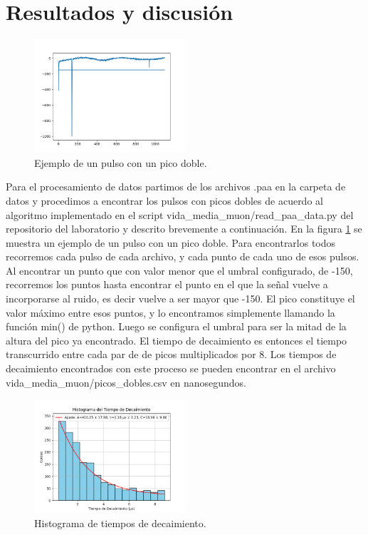 \documentclass[twocolumn,a4paper,11pt]{scrartcl}
\begin{document}
\section{Resultados y discusión}


\begin{figure}[h]
  \centering
  \includegraphics[width=0.5\textwidth]{pulse_plot.png}
  \caption{Ejemplo de un pulso con un pico doble.}
  \label{fig:pulse_plot}
\end{figure}

Para el procesamiento de datos partimos de los archivos .paa en la carpeta de datos \cite{CarpetaDatos} y procedimos a encontrar los pulsos con picos dobles de acuerdo al algoritmo implementado en el script vida\_media\_muon/read\_paa\_data.py del repositorio del laboratorio \cite{BrianDL_laboratorio} y descrito brevemente a continuación. 
En la figura \ref{fig:pulse_plot} se muestra un ejemplo de un pulso con un pico doble. Para encontrarlos todos recorremos cada pulso de cada archivo, y cada punto de cada uno de esos pulsos.
Al encontrar un punto que con valor menor que el umbral configurado, de -150, recorremos los puntos hasta encontrar el punto en el que la señal vuelve a incorporarse al ruido, es decir vuelve a ser mayor que -150. El pico constituye el valor máximo entre esos puntos, y lo encontramos simplemente llamando la función min() de python. Luego se configura el umbral para ser la mitad de la altura del pico ya encontrado. El tiempo de decaimiento es entonces el tiempo transcurrido entre cada par de de picos multiplicados por 8. Los tiempos de decaimiento encontrados con este proceso se pueden encontrar en el archivo vida\_media\_muon/picos\_dobles.csv en nanosegundos.

\begin{figure}[h]
  \centering
  \includegraphics[width=0.5\textwidth]{histograma.png}
  \caption{Histograma de tiempos de decaimiento.}
  \label{fig:histograma}
\end{figure}
\end{document}
